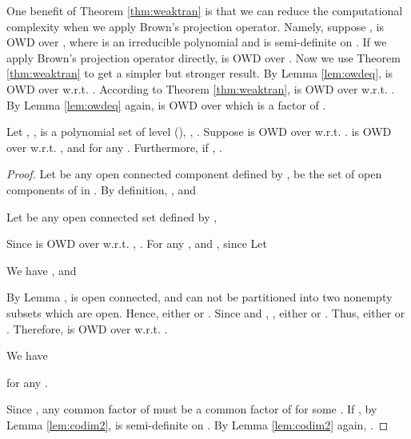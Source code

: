 \documentclass[amsthm]{elsart}
\begin{document}
One benefit of Theorem \ref{thm:weaktran} is that we can reduce the computational complexity when we apply Brown's projection operator. Namely, suppose ,  is OWD over , where  is an irreducible polynomial and is semi-definite on . If we apply Brown's projection operator directly,  is OWD over . Now we use Theorem \ref{thm:weaktran} to get a simpler but stronger result. By Lemma \ref{lem:owdeq},  is OWD over  w.r.t. . According to Theorem \ref{thm:weaktran},  is OWD over  w.r.t. . By Lemma \ref{lem:owdeq} again,  is OWD over  which is a factor of .

\begin{thm}\label{thm:weakgcd}
   Let , ,  is a polynomial set of level  (), , . Suppose  is OWD over  w.r.t. .  is OWD over  w.r.t. , and  for any . Furthermore, if , .
\end{thm}\begin{proof}
Let  be any open connected component defined by ,  be the set of open components of  in . By definition, , and

Let  be any open connected set defined by , 

Since  is OWD over  w.r.t. , .
For any , and ,  since 
Let 

We have , and

By Lemma ,  is open connected, and can not be
partitioned into two nonempty subsets which are open. Hence, either  or .
Since 
and , , either  or . Thus, either  or . Therefore,  is OWD over  w.r.t. .

We have

for any .

Since , any common factor  of  must be a common factor of  for some . If , by Lemma \ref{lem:codim2},  is semi-definite on . By Lemma \ref{lem:codim2} again, .
\end{proof}
\end{document}
